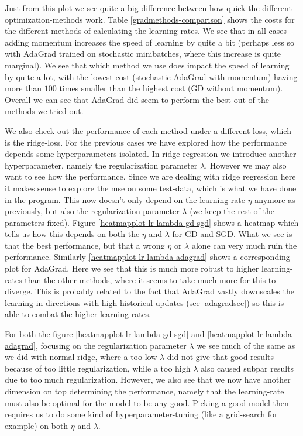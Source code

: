 \documentclass{article}
\begin{document}
Just from this plot we see quite a big difference between how quick the
different optimization-methods work. Table \ref{gradmethods-comparison} shows
the costs for the different methods of calculating the learning-rates. We see
that in all cases adding momentum increases the speed of learning by quite a
bit (perhaps less so with AdaGrad trained on stochastic minibatches, where this
increase is quite marginal). We see that which method we use does impact the
speed of learning by quite a lot, with the lowest cost (stochastic AdaGrad with
momentum) having more than $100$ times smaller than the highest cost (GD without
momentum). Overall we can see that AdaGrad did seem to perform the best out of
the methods we tried out.

We also check out the performance of each method under a different loss, which
is the ridge-loss. For the previous cases we have explored how the performance
depends some hyperparameters isolated. In ridge regression we introduce another
hyperparameter, namely the regularization parameter $\lambda$. However we may
also want to see how the performance. Since we are dealing with ridge regression
here it makes sense to explore the mse on some test-data, which is what we have
done in the program. This now doesn't only depend on the learning-rate $\eta$
anymore as previously, but also the regularization parameter $\lambda$ (we keep
the rest of the parameters fixed). Figure \ref{heatmapplot-lr-lambda-gd-sgd}
shows a heatmap which tells us how this depends on both the $\eta$ and $\lambda$
for GD and SGD.  What we see is that the best performance, but that a wrong
$\eta$ or $\lambda$ alone can very much ruin the performance. Similarly
\ref{heatmapplot-lr-lambda-adagrad} shows a corresponding plot for AdaGrad. Here
we see that this is much more robust to higher learning-rates than the other
methods, where it seems to take much more for this to diverge. This is probably
related to the fact that AdaGrad vastly downscales the learning in directions
with high historical updates (see \ref{adagradsec}) so this is able to combat
the higher learning-rates.

For both the figure \ref{heatmapplot-lr-lambda-gd-sgd} and
\ref{heatmapplot-lr-lambda-adagrad}, focusing on the regularization parameter
$\lambda$ we see much of the same as we did with normal ridge, where a too low
$\lambda$ did not give that good results because of too little regularization,
while a too high $\lambda$ also caused subpar results due to too much
regularization. However, we also see that we now have another dimension on top
determining the performance, namely that the learning-rate must also be optimal
for the model to be any good. Picking a good model then requires us to do some
kind of hyperparameter-tuning (like a grid-search for example) on both $\eta$ and
$\lambda$.
\end{document}
